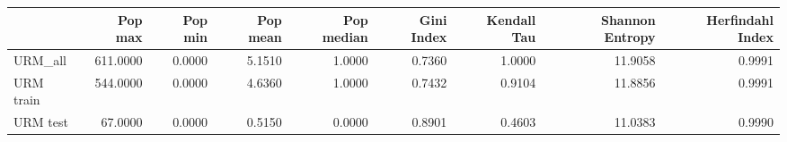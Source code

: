 \begin{tabular}{lrrrrrrrr}
\toprule
{} &  Pop max &  Pop min &  Pop mean &  Pop median &  Gini Index &  Kendall Tau &  Shannon Entropy &  Herfindahl Index \\
\midrule
URM\_all   & 611.0000 &   0.0000 &    5.1510 &      1.0000 &      0.7360 &       1.0000 &          11.9058 &            0.9991 \\
URM train & 544.0000 &   0.0000 &    4.6360 &      1.0000 &      0.7432 &       0.9104 &          11.8856 &            0.9991 \\
URM test  &  67.0000 &   0.0000 &    0.5150 &      0.0000 &      0.8901 &       0.4603 &          11.0383 &            0.9990 \\
\bottomrule
\end{tabular}
